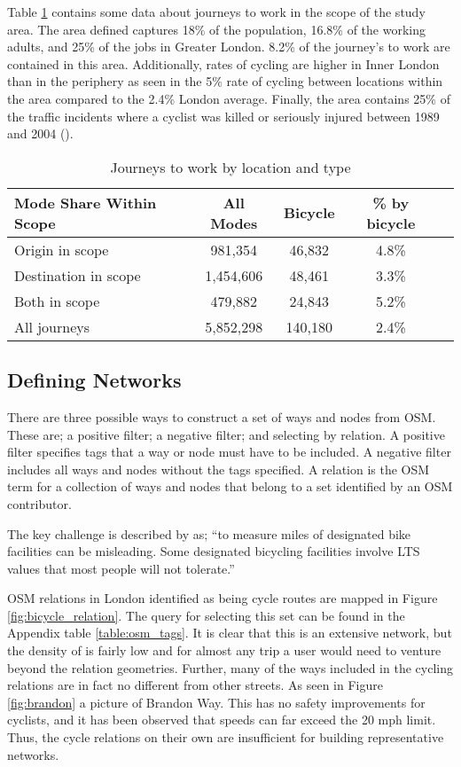 Table \ref{table:commute_data} contains some data about journeys to work in the scope of the study area. The area defined captures 18\% of the population, 16.8\% of the working adults, and 25\% of the jobs in Greater London. 8.2\% of the journey's to work are contained in this area. Additionally, rates of cycling are higher in Inner London than in the periphery as seen in the 5\% rate of cycling between locations within the area compared to the 2.4\% London average. Finally, the area contains 25\% of the traffic incidents where a cyclist was killed or seriously injured between 1989 and 2004 (\cite{cyclistksi}). 
 
\begin{table}[]
\centering
\begin{tabular}{lcccl}
 Mode Share Within Scope & All Modes & Bicycle & \% by bicycle &  \\
 \hline
 Origin in scope &  981,354 & 46,832 & 4.8\% &  \\
 Destination in scope & 1,454,606 & 48,461 & 3.3\% &  \\
 Both in scope & 479,882 & 24,843 & 5.2\% & \\
 All journeys & 5,852,298 & 140,180 & 2.4\% \\ 
\end{tabular}
\caption{Journeys to work by location and type}
\label{table:commute_data}
\end{table}

\subsection{Defining Networks}

There are three possible ways to construct a set of ways and nodes from OSM. These are; a positive filter; a negative filter; and selecting by relation. A positive filter specifies tags that a way or node must have to be included. A negative filter includes all ways and nodes without the tags specified. A relation is the OSM term for a collection of ways and nodes that belong to a set identified by an OSM contributor. 

The key challenge is described by \textcite{furth2016network} as; ``to measure miles of designated bike facilities can be misleading. Some designated bicycling facilities involve LTS values that most people will not tolerate.''

OSM relations in London identified as being cycle routes are mapped in Figure \ref{fig:bicycle_relation}. The query for selecting this set can be found in the Appendix table \ref{table:osm_tags}. It is clear that this is an extensive network, but the density of is fairly low and for almost any trip a user would need to venture beyond the relation geometries. Further, many of the ways included in the cycling relations are in fact no different from other streets. As seen in Figure \ref{fig:brandon} a picture of Brandon Way. This has no safety improvements for cyclists, and it has been observed that speeds can far exceed the 20 mph limit. Thus, the cycle relations on their own are insufficient for building representative networks. 

